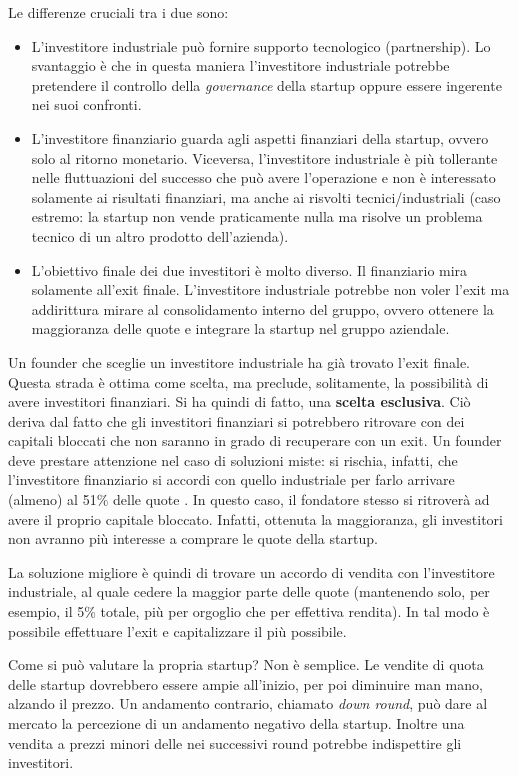 Le differenze cruciali tra i due sono:
\begin{itemize}
 \item L'investitore industriale può fornire supporto tecnologico
 (partnership). Lo svantaggio è che in questa maniera l'investitore industriale
 potrebbe pretendere il controllo della \textit{governance} della startup oppure
 essere ingerente nei suoi confronti.
 \item L'investitore finanziario guarda agli aspetti finanziari della startup,
 ovvero solo al ritorno monetario. Viceversa, l'investitore industriale è più
 tollerante nelle fluttuazioni del successo che può avere l'operazione e non è
 interessato solamente ai risultati finanziari, ma anche ai risvolti
 tecnici/industriali (caso estremo: la startup non vende praticamente nulla ma
 risolve un problema tecnico di un altro prodotto dell'azienda).
 \item L'obiettivo finale dei due investitori è molto diverso. Il finanziario
 mira solamente all'exit finale. L'investitore industriale potrebbe non voler
 l'exit ma addirittura mirare al consolidamento interno del gruppo, ovvero
 ottenere la maggioranza delle quote e integrare la startup nel gruppo
 aziendale.
\end{itemize}

Un founder che sceglie un investitore industriale ha già trovato l'exit
finale.
Questa strada è ottima come scelta, ma preclude, solitamente, la possibilità di
avere investitori finanziari. Si ha quindi di fatto, una \textbf{scelta
esclusiva}. Ciò deriva dal fatto che gli investitori finanziari si potrebbero
ritrovare con dei capitali bloccati che non saranno in grado di recuperare con
un exit. Un founder deve prestare attenzione nel caso di soluzioni miste: si
rischia, infatti, che l'investitore finanziario si accordi
con quello industriale per farlo arrivare (almeno) al 51\% delle quote . In
questo caso, il fondatore stesso si  ritroverà ad avere il proprio capitale
bloccato. Infatti, ottenuta la maggioranza, gli investitori non avranno più
interesse a comprare le quote della startup.

La soluzione migliore è quindi di trovare un accordo di vendita con
l'investitore industriale, al quale cedere la maggior parte delle quote
(mantenendo solo, per esempio, il 5\% totale, più per orgoglio che per
effettiva rendita). In tal modo è possibile effettuare l'exit e capitalizzare
il più possibile.

Come si può valutare la propria startup? Non è semplice. Le vendite di
quota delle startup dovrebbero essere ampie all'inizio, per poi diminuire man
mano, alzando il prezzo. Un andamento contrario, chiamato \textit{down round},
può dare al mercato la percezione di un andamento negativo della startup.
Inoltre una vendita a prezzi minori delle nei successivi round potrebbe
indispettire gli investitori.

